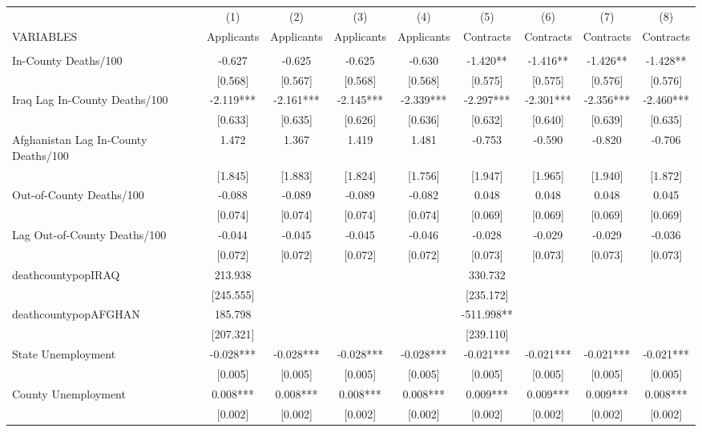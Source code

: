 \documentclass[]{article}
\begin{document}
\begin{tabular}{lcccccccc} \hline
 & (1) & (2) & (3) & (4) & (5) & (6) & (7) & (8) \\
VARIABLES & Applicants & Applicants & Applicants & Applicants & Contracts & Contracts & Contracts & Contracts \\ \hline
 &  &  &  &  &  &  &  &  \\
In-County Deaths/100 & -0.627 & -0.625 & -0.625 & -0.630 & -1.420** & -1.416** & -1.426** & -1.428** \\
 & [0.568] & [0.567] & [0.568] & [0.568] & [0.575] & [0.575] & [0.576] & [0.576] \\
Iraq Lag In-County Deaths/100 & -2.119*** & -2.161*** & -2.145*** & -2.339*** & -2.297*** & -2.301*** & -2.356*** & -2.460*** \\
 & [0.633] & [0.635] & [0.626] & [0.636] & [0.632] & [0.640] & [0.639] & [0.635] \\
Afghanistan Lag In-County Deaths/100 & 1.472 & 1.367 & 1.419 & 1.481 & -0.753 & -0.590 & -0.820 & -0.706 \\
 & [1.845] & [1.883] & [1.824] & [1.756] & [1.947] & [1.965] & [1.940] & [1.872] \\
Out-of-County Deaths/100 & -0.088 & -0.089 & -0.089 & -0.082 & 0.048 & 0.048 & 0.048 & 0.045 \\
 & [0.074] & [0.074] & [0.074] & [0.074] & [0.069] & [0.069] & [0.069] & [0.069] \\
Lag Out-of-County Deaths/100 & -0.044 & -0.045 & -0.045 & -0.046 & -0.028 & -0.029 & -0.029 & -0.036 \\
 & [0.072] & [0.072] & [0.072] & [0.072] & [0.073] & [0.073] & [0.073] & [0.073] \\
deathcountypopIRAQ & 213.938 &  &  &  & 330.732 &  &  &  \\
 & [245.555] &  &  &  & [235.172] &  &  &  \\
deathcountypopAFGHAN & 185.798 &  &  &  & -511.998** &  &  &  \\
 & [207.321] &  &  &  & [239.110] &  &  &  \\
State Unemployment & -0.028*** & -0.028*** & -0.028*** & -0.028*** & -0.021*** & -0.021*** & -0.021*** & -0.021*** \\
 & [0.005] & [0.005] & [0.005] & [0.005] & [0.005] & [0.005] & [0.005] & [0.005] \\
County Unemployment & 0.008*** & 0.008*** & 0.008*** & 0.008*** & 0.009*** & 0.009*** & 0.009*** & 0.008*** \\
 & [0.002] & [0.002] & [0.002] & [0.002] & [0.002] & [0.002] & [0.002] & [0.002] \\

\end{tabular}
\end{document}
